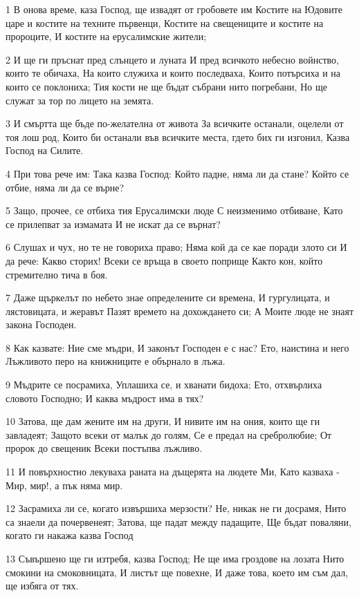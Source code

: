 \par 1 В онова време, каза Господ, ще извадят от гробовете им Костите на Юдовите царе и костите на техните първенци, Костите на свещениците и костите на пророците, И костите на ерусалимские жители;
\par 2 И ще ги пръснат пред слънцето и луната И пред всичкото небесно войнство, които те обичаха, На които служиха и които последваха, Които потърсиха и на които се поклониха; Тия кости не ще бъдат събрани нито погребани, Но ще служат за тор по лицето на земята.
\par 3 И смъртта ще бъде по-желателна от живота За всичките останали, оцелели от тоя лош род, Които би останали във всичките места, гдето бих ги изгонил, Казва Господ на Силите.
\par 4 При това рече им: Така казва Господ: Който падне, няма ли да стане? Който се отбие, няма ли да се върне?
\par 5 Защо, прочее, се отбиха тия Ерусалимски люде С неизменимо отбиване, Като се прилепват за измамата И не искат да се върнат?
\par 6 Слушах и чух, но те не говориха право; Няма кой да се кае поради злото си И да рече: Какво сторих! Всеки се връща в своето поприще Както кон, който стремително тича в боя.
\par 7 Даже щъркелът по небето знае определените си времена, И гургулицата, и лястовицата, и жеравът Пазят времето на дохождането си; А Моите люде не знаят закона Господен.
\par 8 Как казвате: Ние сме мъдри, И законът Господен е с нас? Ето, наистина и него Лъжливото перо на книжниците е обърнало в лъжа.
\par 9 Мъдрите се посрамиха, Уплашиха се, и хванати бидоха; Ето, отхвърлиха словото Господно; И каква мъдрост има в тях?
\par 10 Затова, ще дам жените им на други, И нивите им на ония, които ще ги завладеят; Защото всеки от малък до голям, Се е предал на сребролюбие; От пророк до свещеник Всеки постъпва лъжливо.
\par 11 И повърхностно лекуваха раната на дъщерята на людете Ми, Като казваха - Мир, мир!, а пък няма мир.
\par 12 Засрамиха ли се, когато извършиха мерзости? Не, никак не ги досрамя, Нито са знаели да почервенеят; Затова, ще падат между падащите, Ще бъдат поваляни, когато ги накажа казва Господ
\par 13 Съвършено ще ги изтребя, казва Господ; Не ще има гроздове на лозата Нито смокини на смоковницата, И листът ще повехне, И даже това, което им съм дал, ще избяга от тях.
